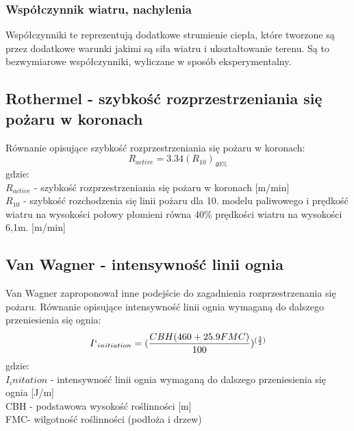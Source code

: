 \documentclass[a4paper, 11pt]{article}
\begin{document}
	\subsubsection{Współczynnik wiatru, nachylenia}
	
	Współczynniki te reprezentują dodatkowe strumienie ciepła, które tworzone są przez dodatkowe warunki jakimi są siła wiatru i ukształtowanie terenu. Są to bezwymiarowe współczynniki, wyliczane w sposób eksperymentalny.
	
	\subsection{Rothermel - szybkość rozprzestrzeniania się pożaru w koronach}
	\indent
	
	Równanie opisujące szybkość rozprzestrzeniania się pożaru w koronach:
	$$
	R_{active}=3.34(R_10)_{40\%}
	$$
	gdzie: \\
	$R_{active}$ - szybkość rozprzestrzeniania się pożaru w koronach [m/min]\\
	$R_10$ - szybkość rozchodzenia się linii pożaru dla 10. modelu paliwowego i prędkość wiatru na wysokości połowy płomieni równa 40\% prędkości wiatru na wysokości 6,1m. [m/min]\\
	
	\subsection{Van Wagner - intensywność linii ognia}
	\indent
	Van Wagner zaproponował inne podejście do zagadnienia rozprzestrzenania się pożaru. Równanie opisujące intensywność linii ognia wymaganą do dalszego przeniesienia się ognia:
	$$
	I`_{initiation}=(\frac{CBH(460+25.9FMC)}{100})^{(\frac{3}{2})}
	$$
	gdzie:\\
	$I_initation$ - intensywność linii ognia wymaganą do dalszego przeniesienia się ognia [J/m] \\
	CBH - podstawowa wysokość roślinności [m]\\
	FMC- wilgotność roślinności (podłoża i drzew)\\

\end{document}
